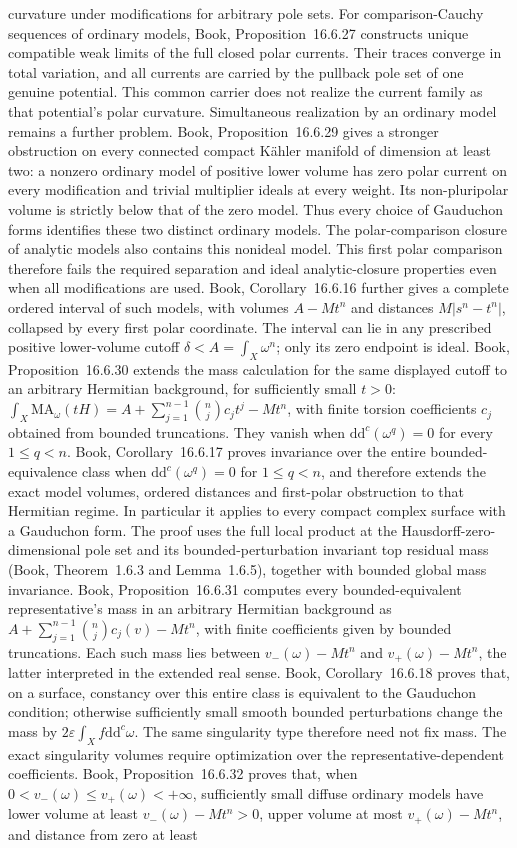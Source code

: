 \documentclass[11pt]{article}
\newcommand{\ddc}{\mathrm d\mathrm d^c}
\begin{document}
curvature under modifications for arbitrary pole sets. For comparison-Cauchy sequences of ordinary models, Book, Proposition~16.6.27 constructs unique compatible weak limits of the full closed polar currents. Their traces converge in total variation, and all currents are carried by the pullback pole set of one genuine potential. This common carrier does not realize the current family as that potential's polar curvature. Simultaneous realization by an ordinary model remains a further problem. Book, Proposition~16.6.29 gives a stronger obstruction on every connected compact K\"ahler manifold of dimension at least two: a nonzero ordinary model of positive lower volume has zero polar current on every modification and trivial multiplier ideals at every weight. Its non-pluripolar volume is strictly below that of the zero model. Thus every choice of Gauduchon forms identifies these two distinct ordinary models. The polar-comparison closure of analytic models also contains this nonideal model. This first polar comparison therefore fails the required separation and ideal analytic-closure properties even when all modifications are used. Book, Corollary~16.6.16 further gives a complete ordered interval of such models, with volumes $A-Mt^n$ and distances $M|s^n-t^n|$, collapsed by every first polar coordinate. The interval can lie in any prescribed positive lower-volume cutoff $\delta<A=\int_X\omega^n$; only its zero endpoint is ideal. Book, Proposition~16.6.30 extends the mass calculation for the same displayed cutoff to an arbitrary Hermitian background, for sufficiently small $t>0$: $\int_X\mathrm{MA}_\omega(tH)=A+\sum_{j=1}^{n-1}\binom nj c_jt^j-Mt^n$, with finite torsion coefficients $c_j$ obtained from bounded truncations. They vanish when $\ddc(\omega^q)=0$ for every $1\leq q<n$. Book, Corollary~16.6.17 proves invariance over the entire bounded-equivalence class when $\ddc(\omega^q)=0$ for $1\leq q<n$, and therefore extends the exact model volumes, ordered distances and first-polar obstruction to that Hermitian regime. In particular it applies to every compact complex surface with a Gauduchon form. The proof uses the full local product at the Hausdorff-zero-dimensional pole set and its bounded-perturbation invariant top residual mass (Book, Theorem~1.6.3 and Lemma~1.6.5), together with bounded global mass invariance. Book, Proposition~16.6.31 computes every bounded-equivalent representative's mass in an arbitrary Hermitian background as $A+\sum_{j=1}^{n-1}\binom nj c_j(v)-Mt^n$, with finite coefficients given by bounded truncations. Each such mass lies between $v_-(\omega)-Mt^n$ and $v_+(\omega)-Mt^n$, the latter interpreted in the extended real sense. Book, Corollary~16.6.18 proves that, on a surface, constancy over this entire class is equivalent to the Gauduchon condition; otherwise sufficiently small smooth bounded perturbations change the mass by $2\varepsilon\int_Xf\ddc\omega$. The same singularity type therefore need not fix mass. The exact singularity volumes require optimization over the representative-dependent coefficients. Book, Proposition~16.6.32 proves that, when $0<v_-(\omega)\leq v_+(\omega)<+\infty$, sufficiently small diffuse ordinary models have lower volume at least $v_-(\omega)-Mt^n>0$, upper volume at most $v_+(\omega)-Mt^n$, and distance from zero at least 
\end{document}
